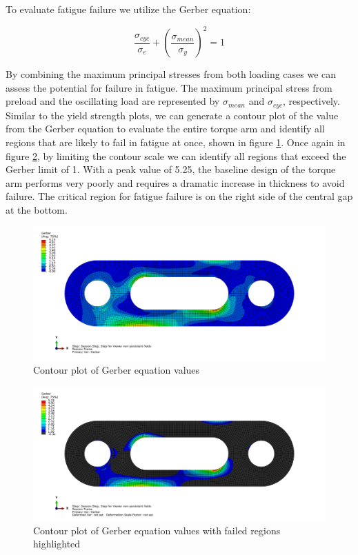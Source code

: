 \documentclass[../main.tex]{subfiles}
\begin{document}
To evaluate fatigue failure we utilize the Gerber equation:

\[
    \frac{\sigma_{cyc}}{\sigma_e} + \left({\frac{\sigma_{mean}}{\sigma_y}}\right)^2 = 1
\]

By combining the maximum principal stresses from both loading cases we can assess the potential for failure in fatigue.
The maximum principal stress from preload and the oscillating load are represented by \(\sigma_{mean}\) and \(\sigma_{cyc}\), respectively.
Similar to the yield strength plots, we can generate a contour plot of the value from the Gerber equation to evaluate the entire torque arm and identify all regions that are likely to fail in fatigue at once, shown in figure \ref{baseline_gerber}.
Once again in figure \ref{baseline_gerber_limited}, by limiting the contour scale we can identify all regions that exceed the Gerber limit of 1.
With a peak value of 5.25, the baseline design of the torque arm performs very poorly and requires a dramatic increase in thickness to avoid failure. 
The critical region for fatigue failure is on the right side of the central gap at the bottom. 

\begin{figure}[H]
    \centering
    \includegraphics[scale=0.2]{../../images/baseline_gerber.png}
    \caption{Contour plot of Gerber equation values}
    \label{baseline_gerber}
\end{figure}

\begin{figure}[H]
    \centering
    \includegraphics[scale=0.2]{../../images/baseline_gerber_limited.png}
    \caption{Contour plot of Gerber equation values with failed regions highlighted}
    \label{baseline_gerber_limited}
\end{figure}
\end{document}

